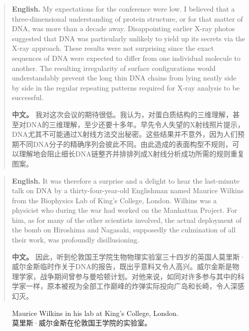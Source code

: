 \begin{quote}
\noindent\textbf{English.} My expectations for the conference were low. I believed that a three-dimensional understanding of protein structure, or for that matter of DNA, was more than a decade away. Disappointing earlier X-ray photos suggested that DNA was particularly unlikely to yield up its secrets via the X-ray approach. These results were not surprising since the exact sequences of DNA were expected to differ from one individual molecule to another. The resulting irregularity of surface configurations would understandably prevent the long thin DNA chains from lying neatly side by side in the regular repeating patterns required for X-ray analysis to be successful.

\smallskip
\noindent\textbf{中文。} 我对这次会议的期待很低。我认为，对蛋白质结构的三维理解，甚至对DNA的三维理解，至少还要十多年。早先令人失望的X射线照片提示，DNA尤其不可能通过X射线方法交出秘密。这些结果并不意外，因为人们预期不同DNA分子的精确序列会彼此不同。由此造成的表面构型不规则，可以理解地会阻止细长DNA链整齐并排排列成X射线分析成功所需的规则重复图案。
\end{quote}

\begin{quote}
\noindent\textbf{English.} It was therefore a surprise and a delight to hear the last-minute talk on DNA by a thirty-four-year-old Englishman named Maurice Wilkins from the Biophysics Lab of King's College, London. Wilkins was a physicist who during the war had worked on the Manhattan Project. For him, as for many of the other scientists involved, the actual deployment of the bomb on Hiroshima and Nagasaki, supposedly the culmination of all their work, was profoundly disillusioning.

\smallskip
\noindent\textbf{中文。} 因此，听到伦敦国王学院生物物理实验室三十四岁的英国人莫里斯·威尔金斯临时作关于DNA的报告，既出乎意料又令人高兴。威尔金斯是物理学家，战争期间曾参与曼哈顿计划。对他来说，如同对许多参与其中的科学家一样，原本被视为全部工作巅峰的炸弹实际投向广岛和长崎，令人深感幻灭。
\end{quote}

\begin{figure}[htbp]
\centering
{}
\caption{Maurice Wilkins in his lab at King's College, London.\\莫里斯·威尔金斯在伦敦国王学院的实验室。}
\end{figure}

